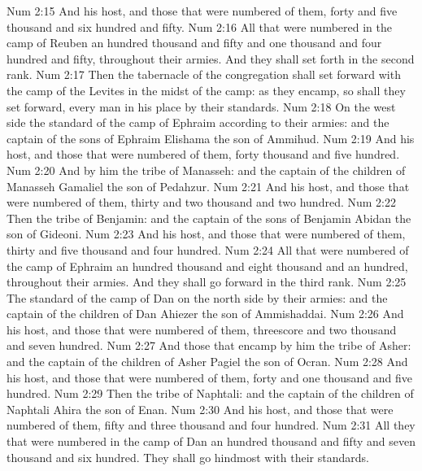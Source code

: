 \vs Num 2:15 And his host, and those that were numbered of them,  forty and five thousand and six hundred and fifty.
\vs Num 2:16 All that were numbered in the camp of Reuben  an hundred thousand and fifty and one thousand and four hundred and fifty, throughout their armies. And they shall set forth in the second rank.
\vs Num 2:17 Then the tabernacle of the congregation shall set forward with the camp of the Levites in the midst of the camp: as they encamp, so shall they set forward, every man in his place by their standards.
\vs Num 2:18 On the west side  the standard of the camp of Ephraim according to their armies: and the captain of the sons of Ephraim  Elishama the son of Ammihud.
\vs Num 2:19 And his host, and those that were numbered of them,  forty thousand and five hundred.
\vs Num 2:20 And by him  the tribe of Manasseh: and the captain of the children of Manasseh  Gamaliel the son of Pedahzur.
\vs Num 2:21 And his host, and those that were numbered of them,  thirty and two thousand and two hundred.
\vs Num 2:22 Then the tribe of Benjamin: and the captain of the sons of Benjamin  Abidan the son of Gideoni.
\vs Num 2:23 And his host, and those that were numbered of them,  thirty and five thousand and four hundred.
\vs Num 2:24 All that were numbered of the camp of Ephraim  an hundred thousand and eight thousand and an hundred, throughout their armies. And they shall go forward in the third rank.
\vs Num 2:25 The standard of the camp of Dan  on the north side by their armies: and the captain of the children of Dan  Ahiezer the son of Ammishaddai.
\vs Num 2:26 And his host, and those that were numbered of them,  threescore and two thousand and seven hundred.
\vs Num 2:27 And those that encamp by him  the tribe of Asher: and the captain of the children of Asher  Pagiel the son of Ocran.
\vs Num 2:28 And his host, and those that were numbered of them,  forty and one thousand and five hundred.
\vs Num 2:29 Then the tribe of Naphtali: and the captain of the children of Naphtali  Ahira the son of Enan.
\vs Num 2:30 And his host, and those that were numbered of them,  fifty and three thousand and four hundred.
\vs Num 2:31 All they that were numbered in the camp of Dan  an hundred thousand and fifty and seven thousand and six hundred. They shall go hindmost with their standards.
